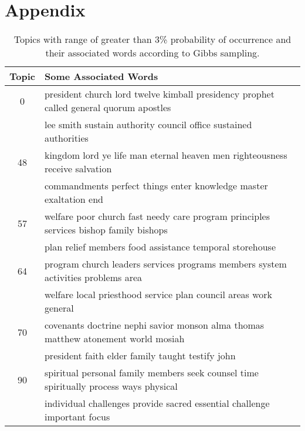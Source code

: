 \section{Appendix}
%

\begin{table}[center]
	\centering
	\begin{center}
		\begin{tabular}{|c|l|} \hline
			\textbf{Topic}					& \textbf{Some Associated Words}		\\ \hline \hline
			0						& president church lord twelve kimball presidency prophet called general quorum apostles \\\									& lee smith sustain authority council office sustained authorities	\\ \hline
			48						& kingdom lord ye life man eternal heaven men righteousness receive salvation \\
									& commandments perfect things enter knowledge master exaltation end	\\ \hline
			57						& welfare poor church fast needy care program principles services bishop family bishops \\
									& plan relief members food assistance temporal storehouse	\\ \hline
			64						& program church leaders services programs members system activities problems area \\
									& welfare local priesthood service plan council areas work general	\\ \hline
			70						& covenants doctrine nephi savior monson alma thomas matthew atonement world mosiah \\
									& president faith elder family taught testify john	\\ \hline
			90						& spiritual personal family members seek counsel time spiritually process ways physical \\
									& individual challenges provide sacred essential challenge important focus	\\ \hline
		\end{tabular}
	\end{center}
	\caption{Topics with range of greater than 3\% probability of occurrence and their associated words according to Gibbs sampling.}
	\label{tab:select-topics}
\end{table}
